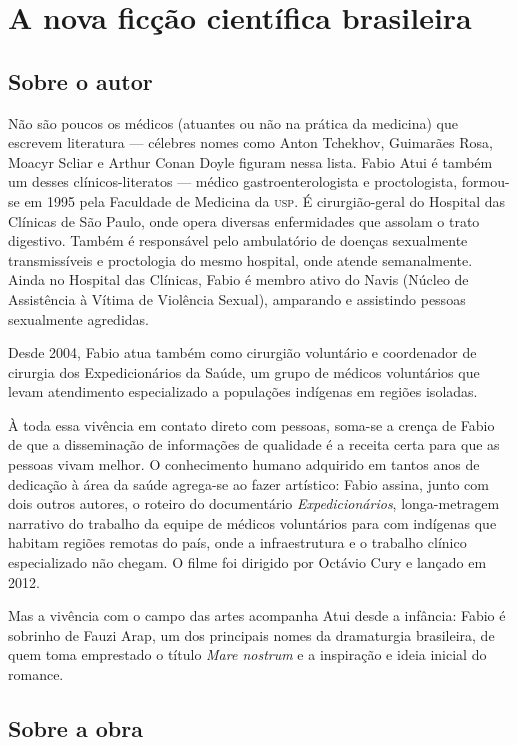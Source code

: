 \chapter{A nova ficção científica brasileira}

\section{Sobre o autor}


Não são poucos os médicos (atuantes ou não na prática da medicina) que escrevem literatura --- célebres nomes como Anton Tchekhov, Guimarães Rosa, Moacyr Scliar e Arthur Conan Doyle figuram nessa lista. Fabio Atui é também um desses clínicos-literatos --- médico gastroenterologista e proctologista, formou-se em 1995 pela Faculdade de Medicina da \textsc{usp}. É cirurgião-geral do Hospital das Clínicas de São Paulo, onde opera diversas enfermidades que assolam o trato digestivo. Também é responsável pelo ambulatório de doenças sexualmente transmissíveis e proctologia do mesmo hospital, onde atende semanalmente. Ainda no Hospital das Clínicas, Fabio é membro ativo do Navis (Núcleo de Assistência à Vítima de Violência Sexual), amparando e assistindo pessoas sexualmente agredidas.

Desde 2004, Fabio atua também como cirurgião voluntário e coordenador de cirurgia dos Expedicionários da Saúde, um grupo de médicos voluntários que levam atendimento especializado a populações indígenas em regiões isoladas. 

À toda essa vivência em contato direto com pessoas, soma-se a crença de Fabio de que a disseminação de informações de qualidade é a receita certa para que as pessoas vivam melhor. O conhecimento humano adquirido em tantos anos de dedicação à área da saúde agrega-se ao fazer artístico: Fabio assina, junto com dois outros autores, o roteiro do documentário \emph{Expedicionários}, longa-metragem narrativo do trabalho da equipe de médicos voluntários para com indígenas que habitam regiões remotas do país, onde a infraestrutura e o trabalho clínico especializado não chegam. O filme foi dirigido por Octávio Cury e lançado em 2012. 

Mas a vivência com o campo das artes acompanha Atui desde a infância: Fabio é sobrinho de Fauzi Arap, um dos principais nomes da dramaturgia brasileira, de quem toma emprestado o título \emph{Mare nostrum} e a inspiração e ideia inicial do romance.

\section{Sobre a obra}

